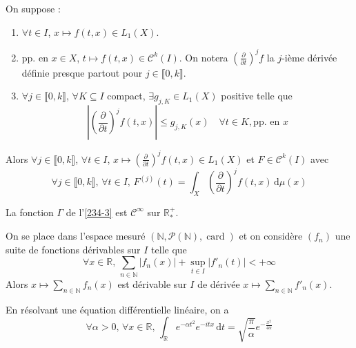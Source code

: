   \begin{theorem}
    On suppose :
    \begin{enumerate}[label={\bfseries(\roman*)}]
      \item $\forall t \in I$, $x \mapsto f(t,x) \in L_1(X)$.
      \item pp. en $x \in X$, $t \mapsto f(t,x) \in \mathcal{C}^k(I)$. On notera $\left(\frac{\partial}{\partial t}\right)^j f$ la $j$-ième dérivée définie presque partout pour $j \in \llbracket 0, k \rrbracket$.
      \item $\forall j \in \llbracket 0, k \rrbracket$, $\forall K \subseteq I$ compact, $\exists g_{j,K} \in L_1(X)$ positive telle que
      \[ \left| \left(\frac{\partial}{\partial t}\right)^j f(t,x) \right| \leq g_{j,K}(x) \quad \forall t \in K, \text{pp. en } x \]
    \end{enumerate}
    Alors $\forall j \in \llbracket 0, k \rrbracket$, $\forall t \in I$, $x \mapsto \left(\frac{\partial}{\partial t}\right)^j f(t,x) \in L_1(X)$ et $F \in \mathcal{C}^k(I)$ avec
    \[ \forall j \in \llbracket 0, k \rrbracket, \, \forall t \in I, \, F^{(j)}(t) = \int_X \left(\frac{\partial}{\partial t}\right)^j f(t, x) \, \mathrm{d}\mu(x) \]
  \end{theorem}


  \begin{example}
    La fonction $\Gamma$ de l'\cref{234-3} est $\mathcal{C}^\infty$ sur $\mathbb{R}^+_*$.
  \end{example}


  \begin{example}
    On se place dans l'espace mesuré $(\mathbb{N}, \mathcal{P}(\mathbb{N}), \operatorname{card})$ et on considère $(f_n)$ une suite de fonctions dérivables sur $I$ telle que
    \[ \forall x \in \mathbb{R}, \, \sum_{n \in \mathbb{N}} |f_n(x)| + \sup_{t \in I} |f'_n(t)| < +\infty \]
    Alors $x \mapsto \sum_{n \in \mathbb{N}} f_n(x)$ est dérivable sur $I$ de dérivée $x \mapsto \sum_{n \in \mathbb{N}} f'_n(x)$.
  \end{example}


  \begin{application}
    En résolvant une équation différentielle linéaire, on a
    \[ \forall \alpha > 0, \, \forall x \in \mathbb{R}, \, \int_{\mathbb{R}} e^{-\alpha t^2} e^{-itx} \, \mathrm{d}t = \sqrt{\frac{\pi}{\alpha}} e^{-\frac{x^2}{4 \alpha}} \]
  \end{application}

